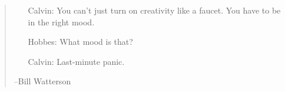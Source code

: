 \documentclass[12pt]{thesis-2}  %
\begin{document}

\pagestyle{plain}
\setcounter{page}{2}


%

\newcommand{\figpreamble}{}
\newcommand{\figpostamble}{}
\newcommand{\figfontsize}[1]{{\small #1}}


\newpage
\setlength{\parskip}{0em}
\small\normalsize

\setcounter{page}{1}

\begin{quote}
	{\em 
	\begin{itemize}
		\item[\rm Calvin:] You can't just turn on creativity like a faucet. You have to be in the right mood.
		\item[\rm Hobbes:] What mood is that?
		\item[\rm Calvin:] Last-minute panic.
	\end{itemize}
	}
	\begin{flushright}
		--Bill Watterson
	\end{flushright}
\end{quote}

\renewcommand{\topfraction}{0.95}

%
%
%
%
%
%
%
\renewcommand{\baselinestretch}{1}
\small\normalsize


\end{document}
